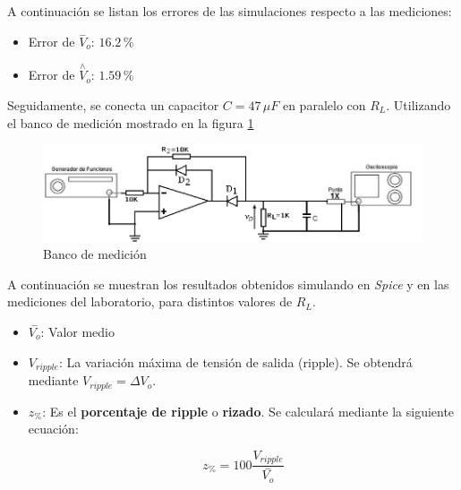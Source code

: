 \documentclass[10pt,spanish,a4paper,openany,notitlepage]{article}
\begin{document}
A continuación se listan los errores de las simulaciones respecto a las mediciones:

\begin{itemize}
    \item Error de $\overset{-}{V}_{o}$:  $ 16.2\,\unit{\%} $
    \item Error de $\overset{\wedge}{V}_{o}$:  $1.59\,\unit{\%} $
\end{itemize}

Seguidamente, se conecta un capacitor $C = 47\,\unit{\mu F}$ en paralelo con 
$R_L$. Utilizando el banco de medición mostrado en la figura \ref{fig:F4_banco_C}

\begin{figure}[H]
\centering
\includegraphics[scale=0.65]{circuitos/FprecisionC.png}
\caption{Banco de medición}
\label{fig:F4_banco_C}
\end{figure}


A continuación se muestran los resultados obtenidos simulando en \emph{Spice}
y en las mediciones del laboratorio, para distintos valores de $R_L$.


\begin{itemize}
    \item $\overset{-}{V_o}$: Valor medio 
    \item $V_{ripple}$: La variación máxima de tensión de salida (ripple).
    Se obtendrá mediante $V_{ripple} = \Delta V_o$. 
    \item $z_{\%}$: Es el \textbf{porcentaje de ripple} o \textbf{rizado}.
    Se calculará mediante la siguiente ecuación:

    \begin{equation}
        z_{\%} = 100 \frac{V_{ripple}}{\overset{-}{V_o}}
        \label{eq:z_ripple}
    \end{equation}

\end{itemize}
\end{document}
